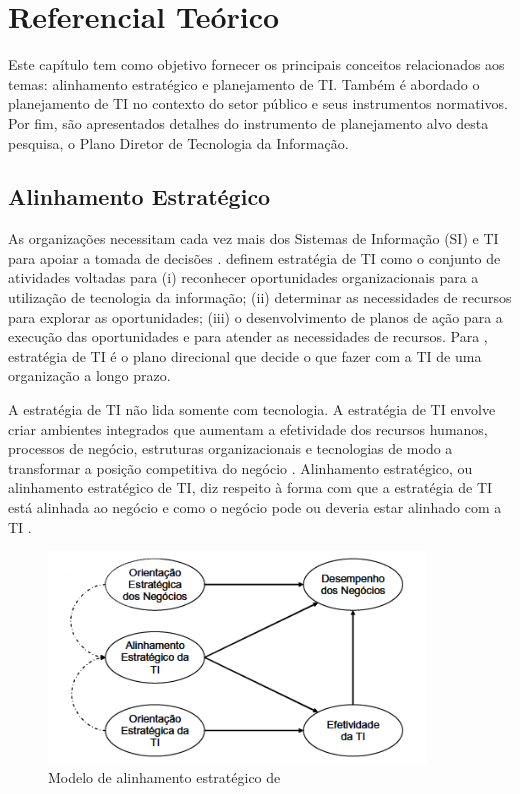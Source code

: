 \chapter{Referencial Teórico}
Este capítulo tem como objetivo fornecer os principais conceitos relacionados aos temas: alinhamento estratégico e planejamento de TI. Também é abordado o planejamento de TI no contexto do setor público e seus instrumentos normativos. Por fim, são apresentados detalhes do instrumento de planejamento alvo desta pesquisa, o Plano Diretor de Tecnologia da Informação.

\section{Alinhamento Estratégico}

As organizações necessitam cada vez mais dos Sistemas de Informação (SI) e TI para apoiar a tomada de decisões \cite{rezende:08}.  definem estratégia de TI como o conjunto de atividades voltadas para (i) reconhecer oportunidades organizacionais para a utilização de tecnologia da informação; (ii) determinar as necessidades de recursos para explorar as oportunidades; (iii) o desenvolvimento de planos de ação para a execução das oportunidades e para atender as necessidades de recursos. Para , estratégia de TI é o plano direcional que decide o que fazer com a TI de uma organização a longo prazo. 

A estratégia de TI não lida somente com tecnologia. A estratégia de TI envolve criar ambientes integrados que aumentam a efetividade dos recursos humanos, processos de negócio, estruturas organizacionais e tecnologias de modo a transformar a posição competitiva do negócio \cite{luftmanetal:04}. Alinhamento estratégico, ou alinhamento estratégico de TI, diz respeito à forma com que a estratégia de TI está alinhada ao negócio e como o negócio pode ou deveria estar alinhado com a TI \cite{luftman:04}. 

\begin{figure}[h!]
\centering %
\includegraphics[width=10cm]{figuras/modeloChan.png}
\caption{Modelo de alinhamento estratégico de }
\label{figura:modeloChan}
\end{figure}


